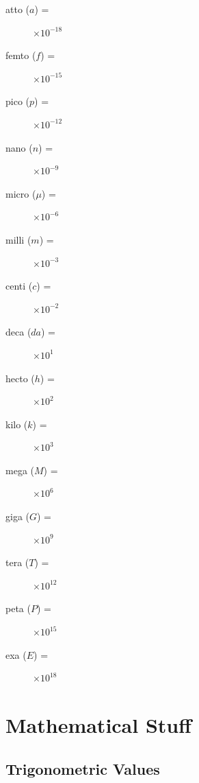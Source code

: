 \documentclass[]{report}
\begin{document}
\begin{description}
\item[atto ($a$) =]$\times 10^{-18}$
\item[femto ($f$) =]$\times 10^{-15}$
\item[pico ($p$) =]$\times 10^{-12}$
\item[nano ($n$) =]$\times 10^{-9}$
\item[micro ($\mu$) =]$\times 10^{-6}$
\item[milli ($m$) =]$\times 10^{-3}$
\item[centi ($c$) =]$\times 10^{-2}$
\item[deca ($da$) =]$\times 10^1$
\item[hecto ($h$) =]$\times 10^2$
\item[kilo ($k$) =]$\times 10^3$
\item[mega ($M$) =]$\times 10^6$
\item[giga ($G$) =]$\times 10^9$
\item[tera ($T$) =]$\times 10^{12}$
\item[peta ($P$) =]$\times 10^{15}$
\item[exa ($E$) =]$\times 10^{18}$
\end{description}

\twocolumn
\chapter{Mathematical Stuff}
\section{Trigonometric Values}
    
\end{document}
